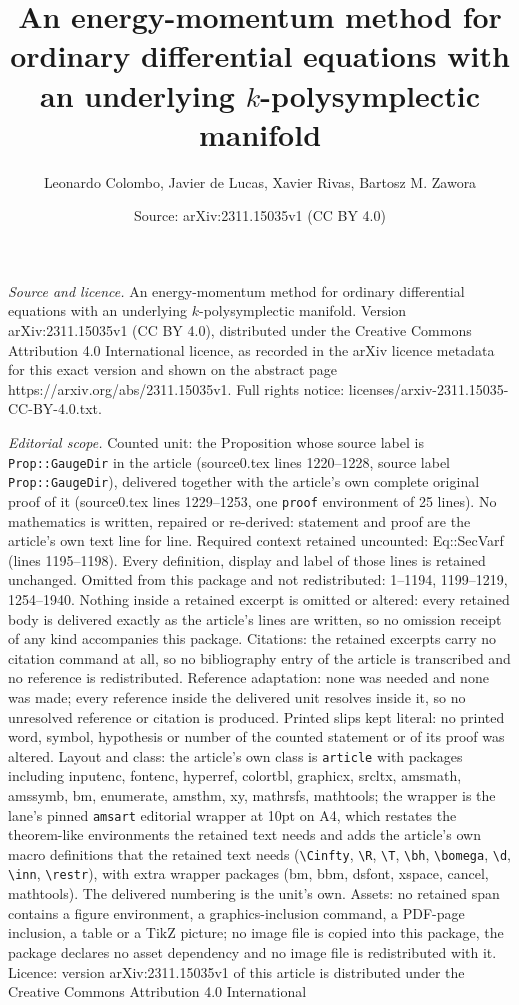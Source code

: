 \documentclass[10pt,a4paper]{amsart}
\title[An energy-momentum method for ordinary differential equation]{An energy-momentum method for ordinary differential equations with an underlying $k$-polysymplectic manifold}
\author{Leonardo Colombo, Javier de Lucas, Xavier Rivas, Bartosz M. Zawora}
\date{Source: arXiv:2311.15035v1 (CC BY 4.0)}
\begin{document}
\maketitle

\noindent\emph{Source and licence.} An energy-momentum method for ordinary differential equations with an underlying $k$-polysymplectic manifold. Version arXiv:2311.15035v1 (CC BY 4.0), distributed under the Creative Commons Attribution 4.0 International licence, as recorded in the arXiv licence metadata for this exact version and shown on the abstract page https://arxiv.org/abs/2311.15035v1. Full rights notice: licenses/arxiv-2311.15035-CC-BY-4.0.txt.\par\smallskip

\noindent\textit{Editorial scope.} Counted unit: the Proposition whose source label is \texttt{Prop::GaugeDir} in the article (source0.tex lines 1220--1228, source label \texttt{Prop::GaugeDir}), delivered together with the article's own complete original proof of it (source0.tex lines 1229--1253, one \texttt{proof} environment of 25 lines). No mathematics is written, repaired or re-derived: statement and proof are the article's own text line for line. Required context retained uncounted: Eq::SecVarf (lines 1195--1198). Every definition, display and label of those lines is retained unchanged. Omitted from this package and not redistributed: 1--1194, 1199--1219, 1254--1940. Nothing inside a retained excerpt is omitted or altered: every retained body is delivered exactly as the article's lines are written, so no omission receipt of any kind accompanies this package. Citations: the retained excerpts carry no citation command at all, so no bibliography entry of the article is transcribed and no reference is redistributed. Reference adaptation: none was needed and none was made; every reference inside the delivered unit resolves inside it, so no unresolved reference or citation is produced. Printed slips kept literal: no printed word, symbol, hypothesis or number of the counted statement or of its proof was altered. Layout and class: the article's own class is \texttt{article} with packages including inputenc, fontenc, hyperref, colortbl, graphicx, srcltx, amsmath, amssymb, bm, enumerate, amsthm, xy, mathrsfs, mathtools; the wrapper is the lane's pinned \texttt{amsart} editorial wrapper at 10pt on A4, which restates the theorem-like environments the retained text needs and adds the article's own macro definitions that the retained text needs (\texttt{\textbackslash Cinfty}, \texttt{\textbackslash R}, \texttt{\textbackslash T}, \texttt{\textbackslash bh}, \texttt{\textbackslash bomega}, \texttt{\textbackslash d}, \texttt{\textbackslash inn}, \texttt{\textbackslash restr}), with extra wrapper packages (bm, bbm, dsfont, xspace, cancel, mathtools). The delivered numbering is the unit's own. Assets: no retained span contains a figure environment, a graphics-inclusion command, a PDF-page inclusion, a table or a TikZ picture; no image file is copied into this package, the package declares no asset dependency and no image file is redistributed with it. Licence: version arXiv:2311.15035v1 of this article is distributed under the Creative Commons Attribution 4.0 International 
\end{document}
